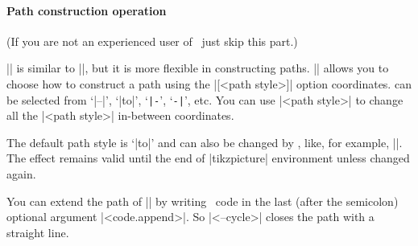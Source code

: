 \paragraph{Path construction operation}
(If you are not an experienced user of \Tikz\, just skip this part.)

|\tzpath| is similar to |\tztos|, but it is more flexible in constructing paths.
|\tzpath| allows you to choose how to construct a path using the |[<path style>]| option  coordinates.  can be selected from `|--|', `|to|', `\verb+|-+', `\verb+-|+', etc.
You can use  |{<path style>}| to change all the |<path style>| in-between coordinates.


\begin{tzcode}{.3}
\end{tzcode}

The default path style is `|to|' and can also be changed by \icmd{\settzpathstyle}, like, for example, |\settzpathstyle{--}|. The effect remains valid until the end of |tikzpicture| environment unless changed again.

\begin{tzcode}{.3}
{}
\end{tzcode}

You can extend the path of |\tzpath| by writing \Tikz\ code in the last (after the semicolon) optional argument |<code.append>|.
So |<--cycle>| closes the path with a straight line.

\begin{tzcode}{.3}
\end{tzcode}

